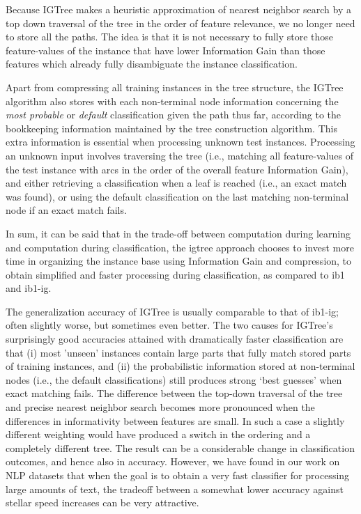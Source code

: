 \documentclass{book}
\begin{document}
Because {\sc IGTree} makes a heuristic approximation of nearest
neighbor search by a top down traversal of the tree in the order of
feature relevance, we no longer need to store all the paths. The idea
is that it is not necessary to fully store those feature-values of the
instance that have lower Information Gain than those features which
already fully disambiguate the instance classification.

Apart from compressing all training instances in the tree structure,
the {\sc IGTree} algorithm also stores with each non-terminal node
information concerning the {\em most probable} or {\em default}
classification given the path thus far, according to the bookkeeping
information maintained by the tree construction algorithm. This extra
information is essential when processing unknown test instances.
Processing an unknown input involves traversing the tree (i.e.,
matching all feature-values of the test instance with arcs in the
order of the overall feature Information Gain), and either retrieving
a classification when a leaf is reached (i.e., an exact match was
found), or using the default classification on the last matching
non-terminal node if an exact match fails.

In sum, it can be said that in the trade-off between computation
during learning and computation during classification, the {\sc
igtree} approach chooses to invest more time in organizing the
instance base using Information Gain and compression, to obtain
simplified and faster processing during classification,
as compared to {\sc ib1} and {\sc ib1-ig}.

The generalization accuracy of {\sc IGTree} is usually comparable to
that of {\sc ib1-ig}; often slightly worse, but sometimes even better.
The two causes for {\sc IGTree}'s surprisingly good accuracies
attained with dramatically faster classification are that (i) most
'unseen' instances contain large parts that fully match stored parts
of training instances, and (ii) the probabilistic information stored
at non-terminal nodes (i.e., the default classifications) still
produces strong `best guesses' when exact matching fails. The
difference between the top-down traversal of the tree and precise
nearest neighbor search becomes more pronounced when the differences
in informativity between features are small. In such a case a slightly
different weighting would have produced a switch in the ordering and a
completely different tree. The result can be a considerable change in
classification outcomes, and hence also in accuracy. However, we have
found in our work on NLP datasets that when the goal is to obtain a
very fast classifier for processing large amounts of text, the
tradeoff between a somewhat lower accuracy against stellar speed
increases can be very attractive.
\end{document}
